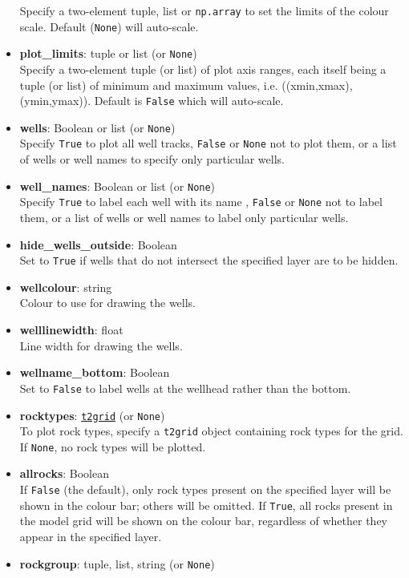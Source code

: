 \begin{itemize}
  Specify a two-element tuple, list or \texttt{np.array} to set the limits of the colour scale.  Default (\texttt{None}) will auto-scale.
\item \textbf{plot\_limits}: tuple or list (or \texttt{None})\\
  Specify a two-element tuple (or list) of plot axis ranges, each itself being a tuple (or list) of minimum and maximum values, i.e. ((xmin,xmax),(ymin,ymax)).  Default is \texttt{False} which will auto-scale.
\item \textbf{wells}: Boolean or list (or \texttt{None})\\
  Specify \texttt{True} to plot all well tracks, \texttt{False} or \texttt{None} not to plot them, or a list of wells or well names to specify only particular wells.
\item \textbf{well\_names}: Boolean or list (or \texttt{None})\\
  Specify \texttt{True} to label each well with its name , \texttt{False} or \texttt{None} not to label them, or a list of wells or well names to label only particular wells.
\item \textbf{hide\_wells\_outside}: Boolean\\
  Set to \texttt{True} if wells that do not intersect the specified layer are to be hidden.
\item \textbf{wellcolour}: string\\
  Colour to use for drawing the wells.
\item \textbf{welllinewidth}: float\\
  Line width for drawing the wells.
\item \textbf{wellname\_bottom}: Boolean\\
  Set to \texttt{False} to label wells at the wellhead rather than the bottom.
\item \textbf{rocktypes}: \hyperref[t2grids]{\texttt{t2grid}} (or \texttt{None})\\
  To plot rock types, specify a \texttt{t2grid} object containing rock types for the grid.  If \texttt{None}, no rock types will be plotted.
\item \textbf{allrocks}: Boolean\\
  If \texttt{False} (the default), only rock types present on the specified layer will be shown in the colour bar; others will be omitted.  If \texttt{True}, all rocks present in the model grid will be shown on the colour bar, regardless of whether they appear in the specified layer.
\item \textbf{rockgroup}: tuple, list, string (or \texttt{None})\\

\end{itemize}
